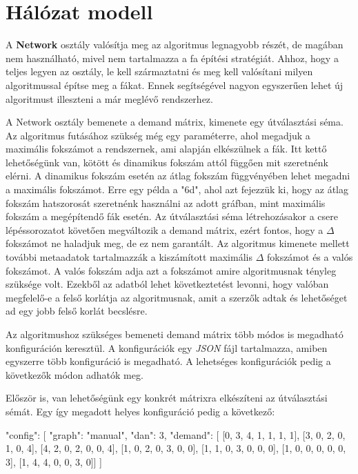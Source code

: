 \documentclass[12pt]{report}
\begin{document}
\section{Hálózat modell}

A \textbf{Network} osztály valósítja meg az algoritmus legnagyobb részét, de magában nem használható, mivel nem tartalmazza a fa építési stratégiát.
Ahhoz, hogy a teljes legyen az osztály, le kell származtatni és meg kell valósítani milyen algoritmussal építse meg a fákat.
Ennek segítségével nagyon egyszerűen lehet új algoritmust illeszteni a már meglévő rendszerhez.

A Network osztály bemenete a demand mátrix, kimenete egy útválasztási séma.
Az algoritmus futásához szükség még egy paraméterre, ahol megadjuk a maximális fokszámot a rendszernek, ami alapján elkészülnek a fák.
Itt kettő lehetőségünk van, kötött és dinamikus fokszám attól függően mit szeretnénk elérni.
A dinamikus fokszám esetén az átlag fokszám függvényében lehet megadni a maximális fokszámot.
Erre egy példa a "6d", ahol azt fejezzük ki, hogy az átlag fokszám hatszorosát szeretnénk használni az adott gráfban, mint maximális fokszám a megépítendő fák esetén.
Az útválasztási séma létrehozásakor a csere lépéssorozatot követően megváltozik a demand mátrix, ezért fontos, hogy a \(\Delta\) fokszámot ne haladjuk meg, de ez nem garantált.
Az algoritmus kimenete mellett további metaadatok tartalmazzák a kiszámított maximális $\Delta$ fokszámot és a valós fokszámot.
A valós fokszám adja azt a fokszámot amire algoritmusnak tényleg szüksége volt.  
Ezekből az adatból lehet következtetést levonni, hogy valóban megfelelő-e a felső korlátja az algoritmusnak, amit a szerzők adtak és lehetőséget ad egy jobb felső korlát becslésre. 


Az algoritmushoz szükséges bemeneti demand mátrix több módos is megadható konfiguráción keresztül.
A konfigurációk egy  \textit{JSON} fájl tartalmazza, amiben egyszerre több konfiguráció is megadható. 
A lehetséges konfigurációk pedig a következők módon adhatók meg.

Először is, van lehetőségünk egy konkrét mátrixra elkészíteni az útválasztási sémát.
Egy így megadott helyes konfiguráció pedig a következő:

\pagebreak

\begin{mintedJson}
	{
		"config": [
		{ 
			"graph": "manual",
			"dan": 3,
			"demand": [
			[0, 3, 4, 1, 1, 1, 1],
			[3, 0, 2, 0, 1, 0, 4],
			[4, 2, 0, 2, 0, 0, 4],
			[1, 0, 2, 0, 3, 0, 0],
			[1, 1, 0, 3, 0, 0, 0],
			[1, 0, 0, 0, 0, 0, 3],
			[1, 4, 4, 0, 0, 3, 0]]	
		} ]
	}
\end{mintedJson}
\end{document}
